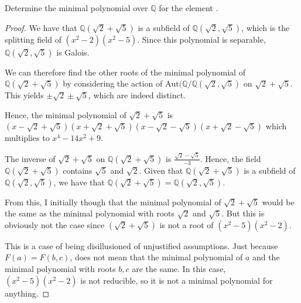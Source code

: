 \documentclass[10pt]{article}
\newcommand{\Q}{\mathbb{Q}}
\newenvironment{problem}[2][Problem]{\begin{trivlist}
		\item[\hskip \labelsep {\bfseries #1}\hskip \labelsep {\bfseries #2.}]}{\end{trivlist}}
\begin{document}
	\begin{problem}{2.1}
		Determine the minimal polynomial over $\Q$ for the element .
		\begin{proof}
			We have that $\Q(\sqrt{2}+\sqrt{5})$ is a subfield of $\Q(\sqrt{2}, \sqrt{5})$, which is the splitting field of $(x^2-2)(x^2-5)$. Since this polynomial is separable, $\Q(\sqrt{2}, \sqrt{5})$ is Galois.
			
			We can therefore find the other roots of the minimal polynomial of $\Q(\sqrt{2}+\sqrt{5})$ by considering the action of $\text{Aut}(\Q/\Q(\sqrt{2}, \sqrt{5})$ on $\sqrt{2}+\sqrt{5}$. This yields $\pm\sqrt{2} \pm\sqrt{5}$, which are indeed distinct. 
			
			Hence, the minimal polynomial of $\sqrt{2}+\sqrt{5}$ is $(x - \sqrt{2}+\sqrt{5})(x + \sqrt{2}+\sqrt{5})(x - \sqrt{2}-\sqrt{5})(x + \sqrt{2}-\sqrt{5})$ which multiplies to $x^4 - 14x^2 + 9$.
			
			
			\rem
				The inverse of $\sqrt{2}+\sqrt{5}$ on $\Q(\sqrt{2}+\sqrt{5})$ is $\frac{\sqrt{2}-\sqrt{5}}{-3}$. Hence, the field $\Q(\sqrt{2}+\sqrt{5})$ contains $\sqrt{5}$ and $\sqrt{2}$. Given that $\Q(\sqrt{2}+\sqrt{5})$ is a subfield of $\Q(\sqrt{2}, \sqrt{5})$, we have that $\Q(\sqrt{2} + \sqrt{5}) = \Q(\sqrt{2}, \sqrt{5})$.
			
				From this, I initially though that the minimal polynomial of $\sqrt{2}+\sqrt{5}$ would be the same as the minimal polynomial with roots $\sqrt{2}$ and $\sqrt{5}$. But this is obviously not the case since $(\sqrt{2}+\sqrt{5})$ is not a root of $(x^2 - 5)(x^2 - 2)$.
				
				This is a case of being disillusioned of unjustified assumptions. Just because $F(a) = F(b,c)$, does not mean that the minimal polynomial of $a$ and the minimal polynomial with roots $b,c$ are the same. In this case, $(x^2 - 5)(x^2 - 2)$ is not reducible, so it is not a minimal polynomial for anything.
		\end{proof}
	\end{problem}
	
\end{document}
